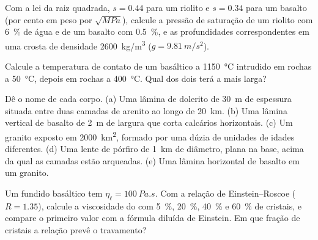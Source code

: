 \begin{exercise}[$\star$]\label{exo:b2:magma-emplacement:2}
Com a lei da raiz quadrada, $s = 0.44$ para um riolito e $s = 0.34$ para um basalto
(por cento em peso por $\sqrt{\unit{MPa}}$), calcule a pressão de saturação de um
riolito com \qty{6}{\percent} de água e de um basalto com \qty{0.5}{\percent},
e as profundidades correspondentes em uma crosta de densidade \qty{2600}{kg/m^3}
($g = \qty{9.81}{m/s^2}$).
\end{exercise}

\begin{exercise}[$\star$]\label{exo:b2:magma-emplacement:3}
Calcule a temperatura de contato de um  basáltico a \qty{1150}{\celsius}
intrudido em rochas a \qty{50}{\celsius}, depois em rochas a
\qty{400}{\celsius}. Qual dos dois  terá a  mais larga?
\end{exercise}

\begin{exercise}[$\star$]\label{exo:b2:magma-emplacement:4}
Dê o nome de cada corpo. (a) Uma lâmina de dolerito de \qty{30}{m} de espessura situada entre duas camadas
de arenito ao longo de \qty{20}{km}. (b) Uma lâmina vertical de basalto de \qty{2}{m} de largura
que corta calcários horizontais. (c) Um granito exposto em \qty{2000}{km^2},
formado por uma dúzia de unidades de idades diferentes. (d) Uma lente de pórfiro de \qty{1}{km} de diâmetro,
plana na base, acima da qual as camadas estão arqueadas. (e) Uma lâmina horizontal
de basalto em um granito.
\end{exercise}

\begin{exercise}[$\star\star$]\label{exo:b2:magma-emplacement:5}
Um fundido basáltico tem $\eta_{\ell} = \qty{100}{Pa.s}$. Com a relação de Einstein--Roscoe
($R = 1.35$), calcule a viscosidade do  com
\qty{5}{\percent}, \qty{20}{\percent}, \qty{40}{\percent} e \qty{60}{\percent} de
cristais, e compare o primeiro valor com a fórmula diluída de Einstein. Em que fração de cristais
a relação prevê o travamento?
\end{exercise}

